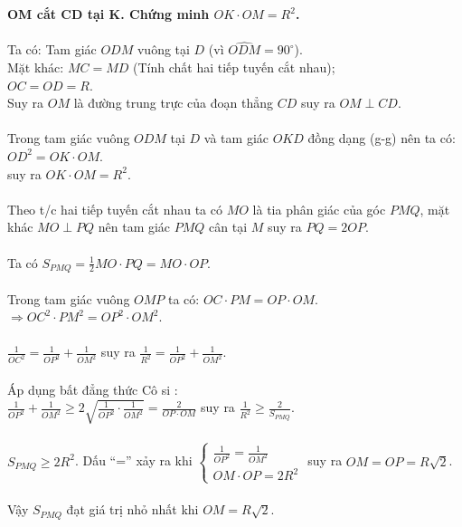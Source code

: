 \begin{ex}
{{\begin{center}
	\end{center}
	\noindent
	\textbf{OM cắt CD tại K. Chứng minh $OK \cdot OM = R^2$.} \\
	\\
	Ta có: Tam giác $ODM$ vuông tại $D$ (vì $\widehat{ODM} = 90^\circ$). \\
	Mặt khác: $MC = MD$ (Tính chất hai tiếp tuyến cắt nhau); \\
	$OC = OD = R$. \\
	Suy ra $OM$ là đường trung trực của đoạn thẳng $CD$ suy ra $OM \perp CD$. \\
	\\
	Trong tam giác vuông $ODM$ tại $D$ và tam giác $OKD$ đồng dạng (g-g) nên ta có: \\
	$OD^2 = OK \cdot OM$. \\
	suy ra $OK \cdot OM = R^2$. \\
	\\
	Theo t/c hai tiếp tuyến cắt nhau ta có $MO$ là tia phân giác của góc $PMQ$, mặt \\
	khác $MO \perp PQ$ nên tam giác $PMQ$ cân tại $M$ suy ra $PQ = 2OP$. \\
	\\
	Ta có $S_{PMQ} = \frac{1}{2} MO \cdot PQ = MO \cdot OP$. \\
	\\
	Trong tam giác vuông $OMP$ ta có: $OC \cdot PM = OP \cdot OM$. \\
	$\Rightarrow OC^2 \cdot PM^2 = OP^2 \cdot OM^2$. \\
	\\
	$\frac{1}{OC^2} = \frac{1}{OP^2} + \frac{1}{OM^2}$ suy ra $\frac{1}{R^2} = \frac{1}{OP^2} + \frac{1}{OM^2}$. \\
	\\
	Áp dụng bất đẳng thức Cô si : \\
	$\frac{1}{OP^2} + \frac{1}{OM^2} \ge 2 \sqrt{\frac{1}{OP^2} \cdot \frac{1}{OM^2}} = \frac{2}{OP \cdot OM}$ suy ra $\frac{1}{R^2} \ge \frac{2}{S_{PMQ}}$. \\
	\\
	$S_{PMQ} \ge 2R^2$. Dấu “=” xảy ra khi
	$\begin{cases}
		\frac{1}{OP^2} = \frac{1}{OM^2} \\
		OM \cdot OP = 2R^2
	\end{cases}$
	suy ra $OM = OP = R\sqrt{2}$. \\
	\\
	Vậy $S_{PMQ}$ đạt giá trị nhỏ nhất khi $OM = R\sqrt{2}$. \\
}}
\end{ex}
